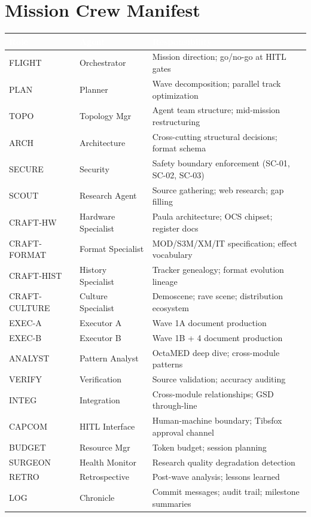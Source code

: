 \documentclass[11pt,letterpaper]{article}
\newcommand{\tableheader}[1]{\textbf{\sffamily\textcolor{white}{#1}}}
\begin{document}
\section{Mission Crew Manifest}

\begin{center}
\begin{tabularx}{\textwidth}{L{2cm}L{3cm}X}
\toprule
{}
\tableheader{Role} & \tableheader{Agent} & \tableheader{Responsibility} \\
\midrule
FLIGHT & Orchestrator & Mission direction; go/no-go at HITL gates \\
PLAN & Planner & Wave decomposition; parallel track optimization \\
TOPO & Topology Mgr & Agent team structure; mid-mission restructuring \\
ARCH & Architecture & Cross-cutting structural decisions; format schema \\
SECURE & Security & Safety boundary enforcement (SC-01, SC-02, SC-03) \\
SCOUT & Research Agent & Source gathering; web research; gap filling \\
CRAFT-HW & Hardware Specialist & Paula architecture; OCS chipset; register docs \\
CRAFT-FORMAT & Format Specialist & MOD/S3M/XM/IT specification; effect vocabulary \\
CRAFT-HIST & History Specialist & Tracker genealogy; format evolution lineage \\
CRAFT-CULTURE & Culture Specialist & Demoscene; rave scene; distribution ecosystem \\
EXEC-A & Executor A & Wave 1A document production \\
EXEC-B & Executor B & Wave 1B + 4 document production \\
ANALYST & Pattern Analyst & OctaMED deep dive; cross-module patterns \\
VERIFY & Verification & Source validation; accuracy auditing \\
INTEG & Integration & Cross-module relationships; GSD through-line \\
CAPCOM & HITL Interface & Human-machine boundary; Tibsfox approval channel \\
BUDGET & Resource Mgr & Token budget; session planning \\
SURGEON & Health Monitor & Research quality degradation detection \\
RETRO & Retrospective & Post-wave analysis; lessons learned \\
LOG & Chronicle & Commit messages; audit trail; milestone summaries \\
\bottomrule
\end{tabularx}
\end{center}
\end{document}
